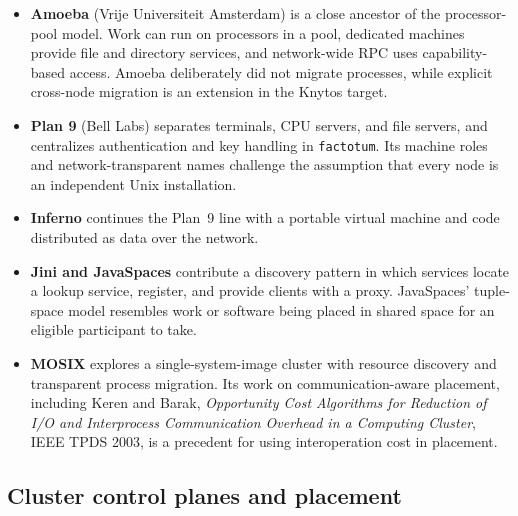 \begin{itemize}
    \item \textbf{Amoeba} (Vrije Universiteit Amsterdam) is a close ancestor
        of the processor-pool model. Work can run on processors in a pool,
        dedicated machines provide file and directory services, and
        network-wide RPC uses capability-based access. Amoeba deliberately
        did not migrate processes, while explicit cross-node migration is an
        extension in the Knytos target.

    \item \textbf{Plan 9} (Bell Labs) separates terminals, CPU servers, and
        file servers, and centralizes authentication and key handling in
        \texttt{factotum}. Its machine roles and network-transparent names
        challenge the assumption that every node is an independent Unix
        installation.

    \item \textbf{Inferno} continues the Plan~9 line with a portable virtual
        machine and code distributed as data over the network.

    \item \textbf{Jini and JavaSpaces} contribute a discovery pattern in
        which services locate a lookup service, register, and provide clients
        with a proxy. JavaSpaces' tuple-space model resembles work or
        software being placed in shared space for an eligible participant to
        take.

    \item \textbf{MOSIX} explores a single-system-image cluster with resource
        discovery and transparent process migration. Its work on
        communication-aware placement, including Keren and Barak,
        \emph{Opportunity Cost Algorithms for Reduction of I/O and
        Interprocess Communication Overhead in a Computing Cluster}, IEEE
        TPDS 2003, is a precedent for using interoperation cost in placement.
\end{itemize}

\subsection{Cluster control planes and placement}

